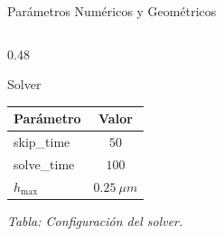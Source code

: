 \documentclass[aspectratio=169]{beamer}
\begin{document}
{\begin{frame}{Parámetros Numéricos y Geométricos}
\begin{columns}[t]
\begin{column}{0.48\textwidth}
        \vspace{0.25cm}

        \begin{block}{\centering Solver}
          \centering
          \begin{tabular}{lc}
            \hline
            \textbf{Parámetro} & \textbf{Valor} \\
            \hline
            skip\_time & $50$ \\
            solve\_time & $100$ \\
            $h_{\max}$ & $0.25~\mu m$ \\
            \hline
          \end{tabular}
        \end{block}
        \centering\textit{Tabla: Configuración del solver.}
      \end{column}
    \end{columns}
  \end{frame}
}
\end{document}
